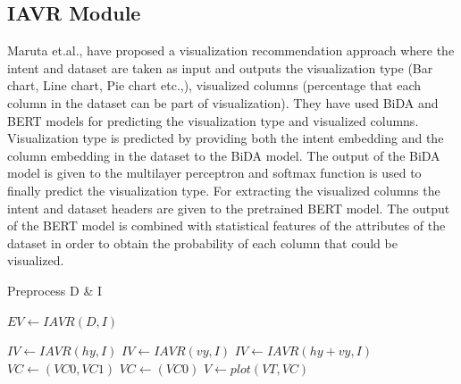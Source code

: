 \subsection{IAVR Module} 

Maruta et.al.,\cite{maruta2021intent} have proposed a visualization recommendation approach where the intent and dataset are taken as input and outputs the visualization type (Bar chart, Line chart, Pie chart etc.,), visualized columns (percentage that each column in the dataset can be part of visualization). They have used BiDA \cite{seo2016bidirectional} and BERT \cite{devlin2018bert} models for predicting the visualization type and visualized columns. Visualization type is predicted by providing both the intent embedding and the column embedding in the dataset to the BiDA model. The output of the BiDA model is given to the multilayer perceptron and softmax function is used to finally predict the visualization type. For extracting the visualized columns the intent and dataset headers are given to the pretrained BERT model. The output of the BERT model is combined with statistical features of the attributes of the dataset in order to obtain the probability of each column that could be visualized.

\begin{algorithm}[!ht]
\caption{Incremental Visualization Recommendation (IVR)}\label{algo1}
Preprocess D \& I

\(EV \leftarrow IAVR(D,I)\)

{
\(IV \leftarrow IAVR(hy,I)\)
}   
{
    \(IV \leftarrow IAVR(vy,I)\)
}
{
    \(IV \leftarrow IAVR(hy+vy,I)\)
}
{
    {
        \(VC \leftarrow (VC0,VC1)\)
    }
    \Else
    {    
    \(VC \leftarrow (VC0)\)
    }
}
    \(V \leftarrow plot(VT, VC)\)
    
\end{algorithm}
